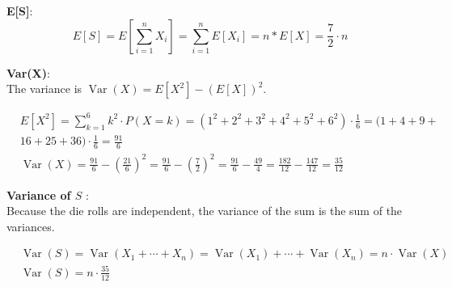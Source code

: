 \documentclass[11pt]{article}
\begin{document}
\textbf{E[S]}:\\
\[
E[S] = E[\sum_{i = 1}^{n}X_{i}] = \sum_{i = 1}^{n}E[X_{i}]= n * E[X] = \frac{7}{2}  \cdot n
\]



\textbf{Var(X)}:\\


The variance is $\operatorname{Var}(X)=E\left[X^2\right]-(E[X])^2$.

$$
\begin{aligned}
& E\left[X^2\right]=\sum_{k=1}^6 k^2 \cdot P(X=k)=\left(1^2+2^2+3^2+4^2+5^2+6^2\right) \cdot \frac{1}{6}=(1+4+9+ \\
& 16+25+36) \cdot \frac{1}{6}=\frac{91}{6} \\
& \operatorname{Var}(X)=\frac{91}{6}-(\frac{21}{6})^2=\frac{91}{6}-\left(\frac{7}{2}\right)^2=\frac{91}{6}-\frac{49}{4}=\frac{182}{12}-\frac{147}{12}=\frac{35}{12}
\end{aligned}
$$



\textbf{Variance of \(S\)} : \\
Because the die rolls are independent, the variance of the sum is the sum of the variances.

$$
\begin{aligned}
& \operatorname{Var}(S)=\operatorname{Var}\left(X_1+\cdots+X_n\right)=\operatorname{Var}\left(X_1\right)+\cdots+\operatorname{Var}\left(X_n\right)=n \cdot \operatorname{Var}(X) \\
& \operatorname{Var}(S)=n \cdot \frac{35}{12}
\end{aligned}
$$
\end{document}
